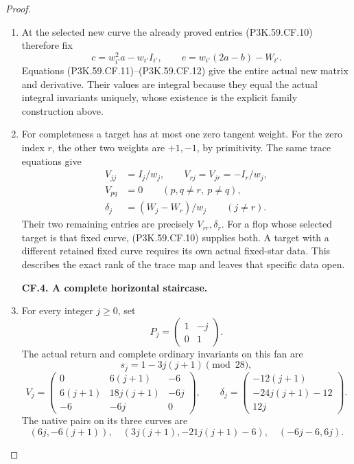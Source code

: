 \begin{proof}
\begin{enumerate}[label=\arabic*.]
\item At the selected new curve the already proved entries (P3K.59.CF.10)
therefore fix
\[
 c=w_{i'}^2a-w_{i'}I_{i'},\qquad
 e=w_{i'}(2a-b)-W_{i'}.                               \tag{P3K.59.CF.12}
\]
Equations (P3K.59.CF.11)--\allowbreak (P3K.59.CF.12) give the entire actual new matrix
and derivative. Their values are integral because they equal
the actual integral invariants uniquely, whose existence is
the explicit family construction above.

\item For completeness a target has at most one zero tangent weight.
For the zero index \(r\), the other two weights are \(+1,-1\),
by primitivity. The same trace equations give
\[
 \begin{aligned}
 V_{jj}&=I_j/w_j,\qquad V_{rj}=V_{jr}=-I_r/w_j,\\
 V_{pq}&=0\qquad(p,q\ne r,\ p\ne q),\\
 \delta_j&=(W_j-W_r)/w_j\qquad(j\ne r).
 \end{aligned}                                      \tag{P3K.59.CF.13}
\]
Their two remaining entries are precisely \(V_{rr},\delta_r\).
For a flop whose selected target is that fixed curve, (P3K.59.CF.10)
supplies both. A target with a different retained fixed curve
requires its own actual fixed-star data. This describes the
exact rank of the trace map and leaves that specific data open.

\par\medskip\noindent\textbf{CF.4. A complete horizontal staircase.}\par\nopagebreak[4]

\item For every integer \(j\ge0\), set
\[
 P_j=\begin{pmatrix}1&-j\\0&1\end{pmatrix}.             \tag{P3K.59.CF.14}
\]
The actual return and complete ordinary invariants on this fan are
\[
 s_j=1-3j(j+1)\pmod {28},
\]
\[
 V_j=\begin{pmatrix}
 0&6(j+1)&-6\\
 6(j+1)&18j(j+1)&-6j\\
 -6&-6j&0
 \end{pmatrix},\qquad
 \delta_j=\begin{pmatrix}
 -12(j+1)\\-24j(j+1)-12\\12j
 \end{pmatrix}.                                      \tag{P3K.59.CF.15}
\]
The native pairs on its three curves are
\[
 (6j,-6(j+1)),\quad
 (3j(j+1),-21j(j+1)-6),\quad
 (-6j-6,6j).                                         \tag{P3K.59.CF.16}
\]


\end{enumerate}
\end{proof}
